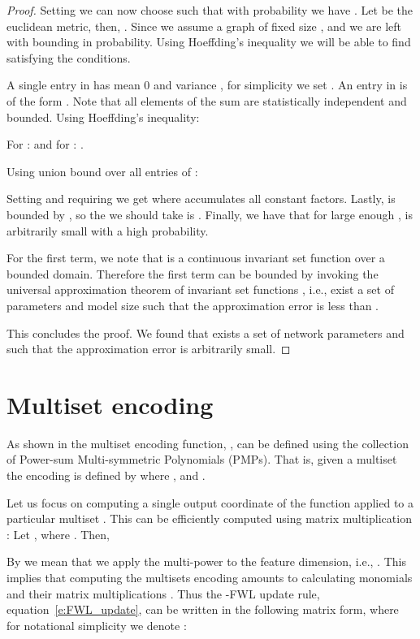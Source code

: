 \documentclass{article} \usepackage{iclr2021_conference,times}
\newcommand{\ie}{{i.e.}}
\def\eqref#1{equation~\ref{#1}}
\begin{document}
\begin{proof}
Setting  we can now choose  such that with probability  we have . 
Let  be the euclidean metric, then, . Since we assume a graph of fixed size ,  and we are left with bounding  in probability. Using Hoeffding's inequality we will be able to find  satisfying the conditions. 


A single entry in  has mean 0 and variance , for simplicity we set .  An entry in  is of the form . Note that all elements of the sum are statistically independent and bounded. Using Hoeffding's inequality:


For :  and for : .

Using union bound over all entries of :

 
Setting  and requiring  we get  where  accumulates all constant factors. Lastly,  is bounded by , so the  we should take is .
Finally, we have that for large enough ,  is arbitrarily small with a high probability. 


For the first term, we note that  is a continuous invariant set function over a bounded domain. Therefore the first term can be bounded by invoking the universal approximation theorem of invariant set functions \citep{zaheer2017deep}, \ie, exist a set of parameters and model size such that the approximation error is less than . 

This concludes the proof. We found that exists a set of network parameters and  such that the approximation error is arbitrarily small. 

\end{proof}


\section{Multiset encoding}\label{app:multiset_enc}
As shown in \cite{maron2019provably} the multiset encoding function, , can be defined using the collection of Power-sum Multi-symmetric Polynomials (PMPs). That is, given a multiset  the encoding is defined by 
where , and  . 

Let us focus on computing a single output coordinate  of the  function applied to a particular multiset . This can be efficiently computed using matrix multiplication \cite{maron2019provably}: Let , where . Then, 

By  we mean that we apply the multi-power  to the feature dimension, \ie, . 
This implies that computing the multisets encoding amounts to calculating monomials  and their matrix multiplications . Thus the -FWL update rule, \eqref{e:FWL_update}, can be written in the following matrix form, where for notational simplicity we denote :
 \\
\end{document}
